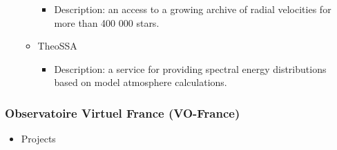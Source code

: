 \documentclass[11pt]{article}
\begin{document}
\begin{itemize}
\begin{itemize}
\begin{itemize}
                                      \item Description: an access to a growing
archive of radial velocities for more than 400 000 stars.
                                  \end{itemize}
                              \item TheoSSA
                                  \begin{itemize} \item Description: a service
for providing spectral energy distributions based on model atmosphere
calculations.
                                  \end{itemize}
                          \end{itemize}
                  \end{itemize}

              \subsubsection{Observatoire Virtuel France (VO-France)}
                  \begin{itemize}
                      \item Projects
                  \end{itemize}
\end{document}
